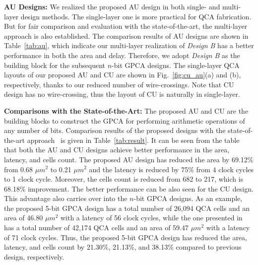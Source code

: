 \documentclass[9pt,journal,compsoc]{IEEEtran}
\begin{document}
\textbf{AU Designs:}
We realized the proposed AU design in both single- and multi-layer design methods.
The single-layer one is more practical for QCA fabrication. 
But for fair comparison and evaluation with the state-of-the-art, the multi-layer approach is also established.
The comparison results of AU designs are shown in Table~\ref{tab:au}, which indicate our multi-layer realization of  \emph{Design B} has a better performance in both the area and delay. 
Therefore, we adopt \emph{Design B} as the building block for the subsequent $n$-bit GPCA designs.
The single-layer QCA layouts of our proposed AU and CU are shown in Fig.~\ref{fig:cu_au}(a) and (b), respectively, thanks to our reduced number of wire-crossings. Note that CU design has no wire-crossing, thus the layout of CU is naturally in single-layer. 

\textbf{Comparisons with the State-of-the-Art:}
The proposed AU and CU are the building blocks to construct the GPCA for performing arithmetic operations of any number of bits.
Comparison results of the proposed designs with the state-of-the-art approach~\cite{2} is given in Table~\ref{tab:result}.
It can be seen from the table that both the AU and CU designs achieve better performance in the area, latency, and cells count.
The proposed AU design has reduced the area by 69.12\% from 0.68 $\mu m^2$ to 0.21 $\mu m^2$ and the latency is reduced by 75\% from 4 clock cycles to 1 clock cycle. Moreover, the cells count is reduced from 682 to 217, which is 68.18\% improvement. The better performance can be also seen for the CU design.    
This advantage also carries over into the $n$-bit GPCA designs. As an example, the proposed 5-bit GPCA design has a total number of 26,094 QCA cells and an area of 46.80 $\mu m^2$ with a latency of 56 clock cycles, while the one presented in~\cite{2} has a total number of 42,174 QCA cells and an area of 59.47 $\mu m^2$ with a latency of 71 clock cycles.
Thus, the proposed 5-bit GPCA design has reduced the area, latency, and cells count by 21.30\%, 21.13\%, and 38.13\% compared to previous design, respectively.
  
\end{document}
